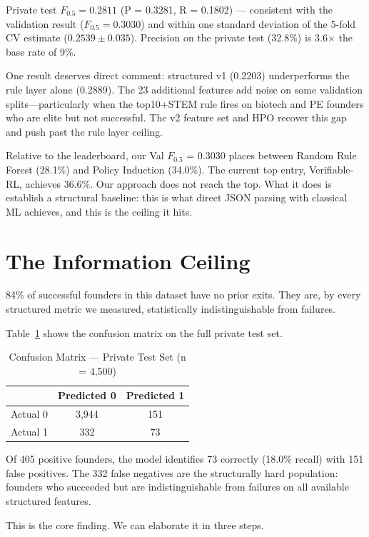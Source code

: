 \documentclass[10pt, conference]{IEEEtran}
\begin{document}
Private test $F_{0.5} = 0.2811$ (P = 0.3281, R = 0.1802) --- consistent with the validation result ($F_{0.5} = 0.3030$) and within one standard deviation of the 5-fold CV estimate ($0.2539 \pm 0.035$). Precision on the private test (32.8\%) is 3.6$\times$ the base rate of 9\%.

One result deserves direct comment: structured v1 (0.2203) underperforms the rule layer alone (0.2889). The 23 additional features add noise on some validation splits---particularly when the top10+STEM rule fires on biotech and PE founders who are elite but not successful. The v2 feature set and HPO recover this gap and push past the rule layer ceiling.

Relative to the leaderboard, our Val $F_{0.5}$ = 0.3030 places between Random Rule Forest (28.1\%) and Policy Induction (34.0\%). The current top entry, Verifiable-RL, achieves 36.6\%. Our approach does not reach the top. What it does is establish a structural baseline: this is what direct JSON parsing with classical ML achieves, and this is the ceiling it hits.

\section{The Information Ceiling}

84\% of successful founders in this dataset have no prior exits. They are, by every structured metric we measured, statistically indistinguishable from failures.

Table~\ref{tab:confusion} shows the confusion matrix on the full private test set.

\begin{table}[h]
\caption{Confusion Matrix --- Private Test Set (n = 4,500)}
\label{tab:confusion}
\centering
\begin{tabular}{lcc}
\hline
 & Predicted 0 & Predicted 1 \\
\hline
Actual 0 & 3,944 & 151 \\
Actual 1 & 332 & 73 \\
\hline
\end{tabular}
\end{table}

Of 405 positive founders, the model identifies 73 correctly (18.0\% recall) with 151 false positives. The 332 false negatives are the structurally hard population: founders who succeeded but are indistinguishable from failures on all available structured features.

This is the core finding. We can elaborate it in three steps.
\end{document}
